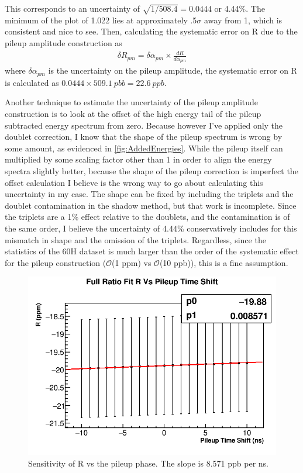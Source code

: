 This corresponds to an uncertainty of $\sqrt{1/508.4} = 0.0444$ or 4.44\%. The minimum of the \chisq plot of 1.022 lies at approximately .5$\sigma$ away from 1, which is consistent and nice to see. Then, calculating the systematic error on R due to the pileup amplitude construction as 
	\begin{align}
		\delta R_{pm} = \delta\alpha_{pm} \times \frac{dR}{d\alpha_{pm}}
	\end{align}
where $\delta\alpha_{pm}$ is the uncertainty on the pileup amplitude, the systematic error on R is calculated as $0.0444 \times \SI{509.1}{pbb} = \SI{22.6}{ppb}$.

Another technique to estimate the uncertainty of the pileup amplitude construction is to look at the offset of the high energy tail of the pileup subtracted energy spectrum from zero. Because however I've applied only the doublet correction, I know that the shape of the pileup spectrum is wrong by some amount, as evidenced in \ref{fig:AddedEnergies}. While the pileup itself can multiplied by some scaling factor other than 1 in order to align the energy spectra slightly better, because the shape of the pileup correction is imperfect the offset calculation I believe is the wrong way to go about calculating this uncertainty in my case. The shape can be fixed by including the triplets and the doublet contamination in the shadow method, but that work is incomplete. Since the triplets are a 1\% effect relative to the doublets, and the contamination is of the same order, I believe the uncertainty of 4.44\% conservatively includes for this mismatch in shape and the omission of the triplets. Regardless, since the statistics of the 60H dataset is much larger than the order of the systematic effect for the pileup construction ($\mathcal{O}$(1 ppm) vs $\mathcal{O}$(10 ppb)), this is a fine assumption.

\begin{figure}[h]
	\centering
	\includegraphics[width=.5\textwidth]{RatioCBO_R_Vs_PileupTimeShift_Canv}
    \caption[PileupPhase]{Sensitivity of R vs the pileup phase. The slope is 8.571 ppb per ns.}
    \label{fig:PileupPhase}
\end{figure}

